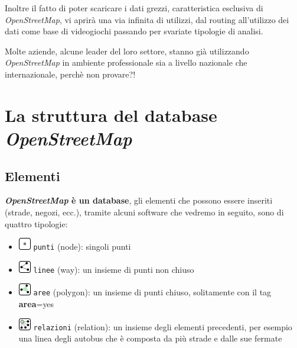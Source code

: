 \documentclass[a4paper,twoside,12pt,]{article}
\newcommand{\osm}{\emph{OpenStreetMap}\xspace}
\newcommand{\key}[1]{\textsf{\textbf{#1}}}
\newcommand{\val}[1]{\textsf{#1}}
\begin{document}
Inoltre il fatto di poter scaricare i dati grezzi, caratteristica esclusiva di \osm, vi aprirà una via infinita di utilizzi, dal routing all'utilizzo dei dati come base di videogiochi passando per svariate tipologie di analisi.

Molte aziende, alcune leader del loro settore, stanno già utilizzando \osm in ambiente professionale sia a livello nazionale che internazionale, perchè non provare?!

\section{La struttura del database \osm}
\subsection{Elementi}
\textbf{\osm è un database}, gli elementi che possono essere inseriti (strade, negozi, ecc.), tramite alcuni software che vedremo in seguito, sono di quattro tipologie:
\begin{itemize}
 \item \includegraphics{./Mf_node.png} \texttt{punti} (node): singoli punti
 \item \includegraphics{./Mf_way.png} \texttt{linee} (way): un insieme di punti non chiuso
 \item \includegraphics{./Mf_area.png} \texttt{aree} (polygon): un insieme di punti chiuso, solitamente con il tag \key{area}=\val{yes}
 \item \includegraphics{./Mf_relation.png} \texttt{relazioni} (relation): un insieme degli elementi precedenti, per esempio una linea degli autobus che è composta da più strade e dalle sue fermate
\end{itemize}
\end{document}
